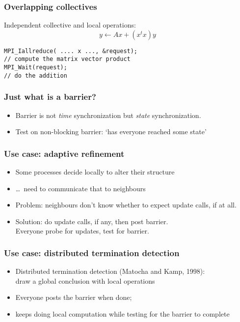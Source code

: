 
\begin{frame}[containsverbatim]\frametitle{Overlapping collectives}
  Independent collective and local operations:
\[ y \leftarrow Ax + (x^tx)y \]
\begin{lstlisting}
MPI_Iallreduce( .... x ..., &request);
// compute the matrix vector product
MPI_Wait(request);
// do the addition
\end{lstlisting}
\end{frame}

\begin{exerciseframe}[procgridnonblock]
  \hyperlink{exprocgrid}{}

  
\end{exerciseframe}


\begin{frame}[containsverbatim]\frametitle{Just what is a barrier?}
  \begin{itemize}
  \item Barrier is not \emph{time} synchronization but \emph{state}
    synchronization.
  \item Test on non-blocking barrier: `has everyone reached some
    state'
  \end{itemize}
\end{frame}

\begin{frame}[containsverbatim]\frametitle{Use case: adaptive refinement}
  \begin{itemize}
  \item Some processes decide locally to alter their structure
  \item \ldots~need to communicate that to neighbours
  \item Problem: neighbours don't know whether to expect update calls,
    if at all.
  \item Solution: do update calls, if any, then post barrier.\\
    Everyone probe for updates, test for barrier.    
  \end{itemize}
\end{frame}

\begin{frame}\frametitle{Use case: distributed termination detection}
  \begin{itemize}
  \item Distributed termination detection (Matocha and Kamp, 1998):\\
    draw a global conclusion with local operations
  \item Everyone posts the barrier when done;
  \item keeps doing local computation while testing for the barrier to
    complete
  \end{itemize}
\end{frame}

